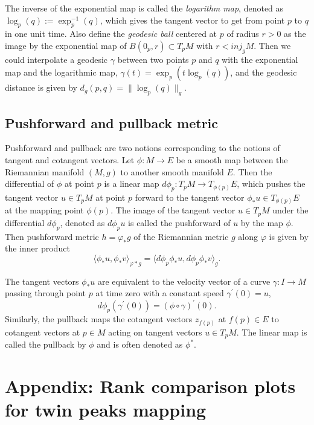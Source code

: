 \documentclass[11pt,a4paper,]{article}
\begin{document}
The inverse of the exponential map is called the \emph{logarithm map}, denoted as \(\log_p(q):= \exp^{-1}_p(q)\), which gives the tangent vector to get from point \(p\) to \(q\) in one unit time. Also define the \emph{geodesic ball} centered at \(p\) of radius \(r > 0\) as the image by the exponential map of \(B(0_p, r) \subset T_pM\) with \(r < \textit{inj}_gM\). Then we could interpolate a geodesic \(\gamma\) between two points \(p\) and \(q\) with the exponential map and the logarithmic map, \(\gamma(t) = \exp_p(t\log_p(q))\), and the geodesic distance is given by \(d_g(p,q) = \|\log_p(q)\|_g\).

\hypertarget{pushforward-and-pullback-metric}{%
\subsection{Pushforward and pullback metric}\label{pushforward-and-pullback-metric}}

Pushforward and pullback are two notions corresponding to the notions of tangent and cotangent vectors.
Let \(\phi: M \rightarrow E\) be a smooth map between the Riemannian manifold \((M,g)\) to another smooth manifold \(E\). Then the differential of \(\phi\) at point \(p\) is a linear map \(d\phi_p: T_pM \rightarrow T_{\phi (p)}E\), which pushes the tangent vector \(u \in T_pM\) at point \(p\) forward to the tangent vector \(\phi_*u \in T_{\phi (p)}E\) at the mapping point \(\phi(p)\).
The image of the tangent vector \(u \in T_pM\) under the differential \(d\phi_p\), denoted as \(d\phi_p u\) is called the pushforward of \(u\) by the map \(\phi\).
Then pushforward metric \(h=\varphi_*g\) of the Riemannian metric \(g\) along \(\varphi\) is given by the inner product
\[
\langle \phi_*u,\phi_*v \rangle_{\varphi*g} = \langle d\phi_p \phi_*u, d\phi_p \phi_*v \rangle_{g}.
\]

The tangent vectors \(\phi_*u\) are equivalent to the velocity vector of a curve \(\gamma: I\rightarrow M\) passing through point \(p\) at time zero with a constant speed \(\gamma^{\prime}(0)=u\),
\[
d\phi_p(\gamma^{\prime}(0)) = (\phi \circ \gamma)^\prime (0).
\]
Similarly, the pullback maps the cotangent vectors \(z_{f(p)}\) at \(f(p) \in E\) to cotangent vectors at \(p \in M\) acting on tangent vectors \(u \in T_pM\). The linear map is called the pullback by \(\phi\) and is often denoted as \(\phi^*\).

\hypertarget{twinpeaksappe}{%
\section{Appendix: Rank comparison plots for twin peaks mapping}\label{twinpeaksappe}}
\end{document}

